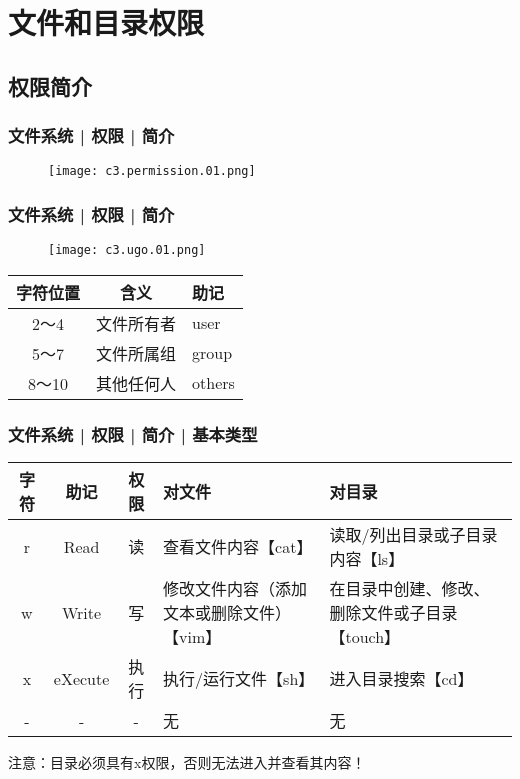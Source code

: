 \section{文件和目录权限}
\subsection{权限简介}
\begin{frame}
  \frametitle{文件系统 | 权限 | \alert{简介}}
  \begin{figure}
    \centering
    \texttt{[image: c3.permission.01.png]}
  \end{figure}
\end{frame}

\begin{frame}
  \frametitle{文件系统 | 权限 | \alert{简介}}
  \begin{figure}
    \centering
    \texttt{[image: c3.ugo.01.png]}
  \end{figure}
  \begin{table}
    \centering
    \begin{tabular}{ccl}
      \hline
      \rowcolor{blue!50}字符位置 & 含义 & 助记\\
      \hline
      2～4 & 文件所有者 & user\\
      5～7 & 文件所属组 & group\\
      8～10 & 其他任何人 & others\\
      \hline
    \end{tabular}
  \end{table}
\end{frame}

\begin{frame}
  \frametitle{文件系统 | 权限 | 简介 | \alert{基本类型}}
  \begin{table}
    \centering
    \begin{tabularx}{\textwidth}{cccXX}
      \hline
      \rowcolor{blue!50}字符 & 助记 & 权限 & 对文件 & 对目录\\
      \hline
      r & Read & 读 & 查看文件内容【cat】 & 读取/列出目录或子目录内容【ls】\\
      w & Write & 写 & 修改文件内容（添加文本或删除文件）【vim】 & 在目录中创建、修改、删除文件或子目录【touch】\\
      x & eXecute & 执行 & 执行/运行文件【sh】 & 进入目录搜索【cd】\\
      - & - & - & 无 & 无\\
      \hline
    \end{tabularx}
  \end{table}
  \centering
  注意：目录必须具有x权限，否则无法进入并查看其内容！
\end{frame}

